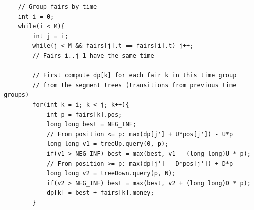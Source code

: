 \documentclass[11pt,a4paper]{article}
\begin{document}
\begin{lstlisting}
    // Group fairs by time
    int i = 0;
    while(i < M){
        int j = i;
        while(j < M && fairs[j].t == fairs[i].t) j++;
        // Fairs i..j-1 have the same time

        // First compute dp[k] for each fair k in this time group
        // from the segment trees (transitions from previous time groups)
        for(int k = i; k < j; k++){
            int p = fairs[k].pos;
            long long best = NEG_INF;
            // From position <= p: max(dp[j'] + U*pos[j']) - U*p
            long long v1 = treeUp.query(0, p);
            if(v1 > NEG_INF) best = max(best, v1 - (long long)U * p);
            // From position >= p: max(dp[j'] - D*pos[j']) + D*p
            long long v2 = treeDown.query(p, N);
            if(v2 > NEG_INF) best = max(best, v2 + (long long)D * p);
            dp[k] = best + fairs[k].money;
        }


\end{lstlisting}
\end{document}
